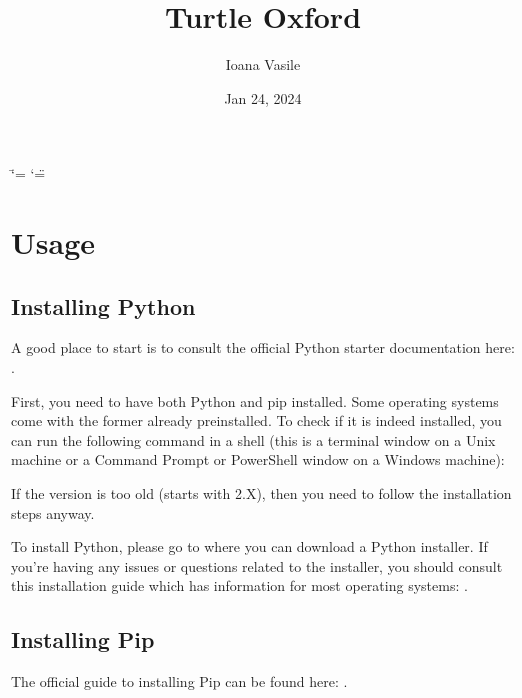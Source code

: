 \documentclass[letterpaper,10pt,english]{sphinxmanual}
\title{Turtle Oxford}
\date{Jan 24, 2024}
\author{Ioana Vasile}
\begin{document}
\ifdefined\shorthandoff
  \ifnum\catcode`\=\string=\active\shorthandoff{=}\fi
  \ifnum\catcode`\"=\active{}\fi
\fi

\pagestyle{empty}
\sphinxmaketitle
\pagestyle{plain}
\sphinxtableofcontents
\pagestyle{normal}
\label{\detokenize{index::doc}}


\sphinxstepscope


\chapter{Usage}
\label{\detokenize{usage:usage}}\label{\detokenize{usage::doc}}

\section{Installing Python}
\label{\detokenize{usage:installing-python}}
\sphinxAtStartPar
A good place to start is to consult the official Python starter documentation here: .

\sphinxAtStartPar
First, you need to have both Python and pip installed. Some operating systems come with the former already pre\sphinxhyphen{}installed. To check if it is indeed installed,
you can run the following command in a shell (this is a terminal window on a Unix machine or a Command Prompt or PowerShell window on a Windows machine):

\begin{sphinxVerbatim}[commandchars=\\\{\}]
 
\end{sphinxVerbatim}

\sphinxAtStartPar
If the version is too old (starts with 2.X), then you need to follow the installation steps anyway.

\sphinxAtStartPar
To install Python, please go to  where you can download a Python installer. If you’re having any issues or questions related to
the installer, you should consult this installation guide which has information for most operating systems: .


\section{Installing Pip}
\label{\detokenize{usage:installing-pip}}
\sphinxAtStartPar
The official guide to installing Pip can be found here: .
\end{document}

